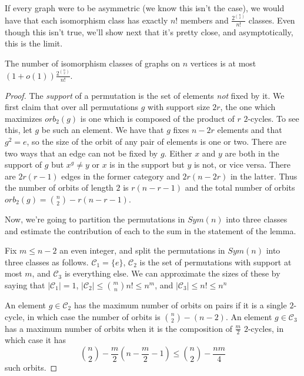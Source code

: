 If every graph were to be asymmetric (we know this isn't the case), we would have that each isomorphism class has exactly $n!$ members and $\frac{2^{\binom{n}{2}}}{n!}$ classes.  Even though this isn't true, we'll show next that it's pretty close, and asymptotically, this is the limit.

\begin{lemma}
	{The number of isomorphism classes of graphs on $n$ vertices is at most $(1+o(1))\frac{2^{\binom{n}{2}}}{n!}$.}
\end{lemma}

\begin{proof}
	
	The \textit{support} of a permutation is the set of elements \textit{not} fixed by it.  We first claim that over all permutations $g$ with support size $2r$, the one which maximizes $orb_2(g)$ is one which is composed of the product of $r$ $2$-cycles.  To see this, let $g$ be such an element.  We have that $g$ fixes $n-2r$ elements and that $g^2=e$, so the size of the orbit of any pair of elements is one or two.  There are two ways that an edge can not be fixed by $g$.  Either $x$ and $y$ are both in the support of $g$ but $x^g\neq y$ or $x$ is in the support but $y$ is not, or vice versa.  There are $2r(r-1)$ edges in the former category and $2r(n-2r)$ in the latter.  Thus the number of orbits of length $2$ is $r(n-r-1)$ and the total number of orbits $orb_2(g)=\binom{n}{2}-r(n-r-1)$.
	
	Now, we're going to partition the permutations in $Sym(n)$ into three classes and estimate the contribution of each to the sum in the statement of the lemma.  
	
	Fix $m\leq n-2$ an even integer, and split the permutations in $Sym(n)$ into three classes as follows.   $\mathcal{C}_1=\{e\}$, $\mathcal{C}_2$ is the set of permutations with support at most $m$, and $\mathcal{C}_3$ is everything else.  We can approximate the sizes of these by saying that $|\mathcal{C}_1|=1$, $|\mathcal{C}_2|\leq \binom{m}{n}n!\leq n^m$, and $|\mathcal{C}_3|\leq n!\leq n^n$
	
	
	An element $g\in \mathcal{C}_2$ has the maximum number of orbits on pairs if it is a single $2$-cycle, in which case the number of orbits is $\binom{n}{2}-(n-2)$.  An element $g\in \mathcal{C}_3$ has a maximum number of orbits when it is the composition of $\frac{m}{2}$ $2$-cycles, in which case it has $$\binom{n}{2}-\frac{m}{2}(n-\frac{m}{2}-1)\leq \binom{n}{2}-\frac{nm}{4}$$ such orbits.
	

\end{proof}
